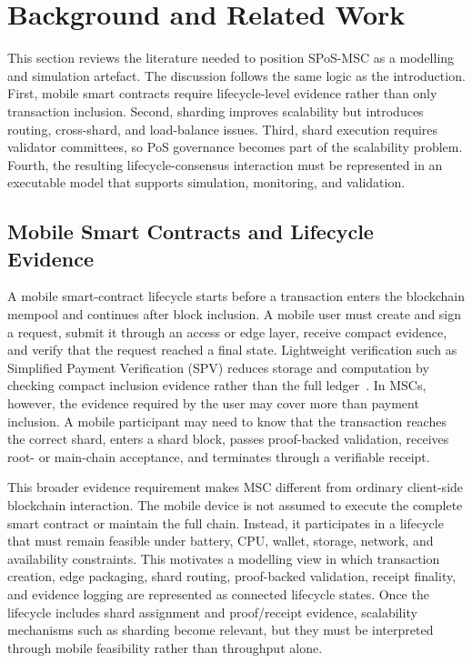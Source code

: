 \documentclass[a4paper,fleqn]{cas-sc}
\begin{document}
\section{Background and Related Work}
\label{sec:background}

This section reviews the literature needed to position SPoS-MSC as a modelling and simulation artefact. The discussion follows the same logic as the introduction. First, mobile smart contracts require lifecycle-level evidence rather than only transaction inclusion. Second, sharding improves scalability but introduces routing, cross-shard, and load-balance issues. Third, shard execution requires validator committees, so PoS governance becomes part of the scalability problem. Fourth, the resulting lifecycle-consensus interaction must be represented in an executable model that supports simulation, monitoring, and validation.

\subsection{Mobile Smart Contracts and Lifecycle Evidence}\label{subsec:msc_constraints}

A mobile smart-contract lifecycle starts before a transaction enters the blockchain mempool and continues after block inclusion. A mobile user must create and sign a request, submit it through an access or edge layer, receive compact evidence, and verify that the request reached a final state. Lightweight verification such as Simplified Payment Verification (SPV) reduces storage and computation by checking compact inclusion evidence rather than the full ledger~\cite{Qin2019SPV}. In MSCs, however, the evidence required by the user may cover more than payment inclusion. A mobile participant may need to know that the transaction reaches the correct shard, enters a shard block, passes proof-backed validation, receives root- or main-chain acceptance, and terminates through a verifiable receipt.

This broader evidence requirement makes MSC different from ordinary client-side blockchain interaction. The mobile device is not assumed to execute the complete smart contract or maintain the full chain. Instead, it participates in a lifecycle that must remain feasible under battery, CPU, wallet, storage, network, and availability constraints. This motivates a modelling view in which transaction creation, edge packaging, shard routing, proof-backed validation, receipt finality, and evidence logging are represented as connected lifecycle states. Once the lifecycle includes shard assignment and proof/receipt evidence, scalability mechanisms such as sharding become relevant, but they must be interpreted through mobile feasibility rather than throughput alone.
\end{document}
